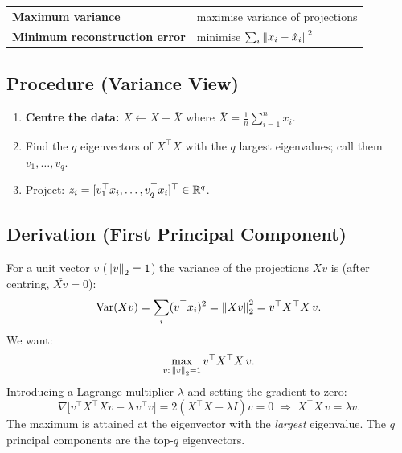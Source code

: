 \documentclass[oneside]{book}
\begin{document}
\begin{center}
\begin{tabular}{ll}
\toprule
\textbf{Maximum variance} & maximise variance of projections \\
\textbf{Minimum reconstruction error} & minimise $\sum_i \left\lVert x_i - \hat x_i \right\rVert^2$ \\
\bottomrule
\end{tabular}
\end{center}

\subsection*{Procedure (Variance View)}

\begin{enumerate}
  \item \textbf{Centre the data:} $X \leftarrow X - \bar{X}$ where
        $\bar{X} = \frac{1}{n}\sum_{i=1}^n x_i$.
  \item Find the $q$ eigenvectors of $X^\top X$ with the $q$ largest
        eigenvalues; call them $v_1,\dots,v_q$.
  \item Project: $z_i = [v_1^\top x_i,\dots,v_q^\top x_i]^\top\in\mathbb{R}^q$.
\end{enumerate}

\subsection*{Derivation (First Principal Component)}

For a unit vector $v$ ($\left\lVert v \right\rVert_2 = 1$) the variance of the projections
$Xv$ is (after centring, $\bar{Xv}=0$):
\[
    \mathrm{Var}(Xv)
    = \sum_i (v^\top x_i)^2
    = \left\lVert Xv \right\rVert_2^2
    = v^\top X^\top X\, v.
\]
We want:
\[
    \max_{v:\,\left\lVert v \right\rVert_2=1} v^\top X^\top X\, v.
\]
Introducing a Lagrange multiplier $\lambda$ and setting the gradient to zero:
\[
    \nabla\bigl[v^\top X^\top X v - \lambda\,v^\top v\bigr]
    = 2(X^\top X - \lambda I)v = 0
    \;\Longrightarrow\;
    \boxed{X^\top X\, v = \lambda v.}
\]
The maximum is attained at the eigenvector with the \emph{largest}
eigenvalue.  The $q$ principal components are the top-$q$ eigenvectors.

\end{document}
